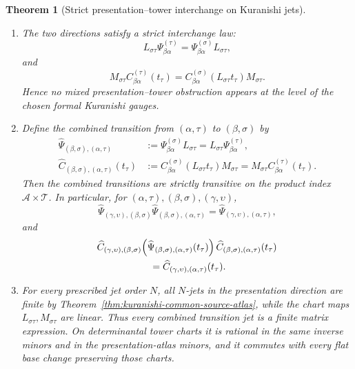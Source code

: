 \documentclass[11pt]{article}
\newtheorem{theorem}{Theorem}[section]
\theoremstyle{definition}
\begin{document}
\begin{theorem}[Strict presentation--tower interchange on Kuranishi jets]
\begin{enumerate}[label=\textnormal{(\roman*)}]
\item The two directions satisfy a strict interchange law:
\begin{equation}\label{eq:kuranishi-source-interchange}
 L_{\sigma\tau}\Psi^{(\tau)}_{\beta\alpha}
 =\Psi^{(\sigma)}_{\beta\alpha}L_{\sigma\tau},
\end{equation}
and
\begin{equation}\label{eq:kuranishi-obstruction-interchange}
 M_{\sigma\tau}C^{(\tau)}_{\beta\alpha}(t_\tau)
 =C^{(\sigma)}_{\beta\alpha}(L_{\sigma\tau}t_\tau)
  M_{\sigma\tau}.
\end{equation}
Hence no mixed presentation--tower obstruction appears at the level of the
chosen formal Kuranishi gauges.

\item Define the combined transition from $(\alpha,\tau)$ to
$(\beta,\sigma)$ by
\begin{align}
 \widehat\Psi_{(\beta,\sigma),(\alpha,\tau)}
 &:=\Psi^{(\sigma)}_{\beta\alpha}L_{\sigma\tau}
   =L_{\sigma\tau}\Psi^{(\tau)}_{\beta\alpha},
 \label{eq:kuranishi-product-source-transition}\\
 \widehat C_{(\beta,\sigma),(\alpha,\tau)}(t_\tau)
 &:=C^{(\sigma)}_{\beta\alpha}(L_{\sigma\tau}t_\tau)M_{\sigma\tau}
   =M_{\sigma\tau}C^{(\tau)}_{\beta\alpha}(t_\tau).
 \label{eq:kuranishi-product-obstruction-transition}
\end{align}
Then the combined transitions are strictly transitive on the product index
$\mathcal A\times\mathcal T$.  In particular, for
$(\alpha,\tau),(\beta,\sigma),(\gamma,\upsilon)$,
\begin{equation}\label{eq:kuranishi-product-source-cocycle}
 \widehat\Psi_{(\gamma,\upsilon),(\beta,\sigma)}
 \widehat\Psi_{(\beta,\sigma),(\alpha,\tau)}
 =\widehat\Psi_{(\gamma,\upsilon),(\alpha,\tau)},
\end{equation}
and
\begin{align}\label{eq:kuranishi-product-obstruction-cocycle}
 &\widehat C_{(\gamma,\upsilon),(\beta,\sigma)}
 \!\left(\widehat\Psi_{(\beta,\sigma),(\alpha,\tau)}(t_\tau)\right)
 \widehat C_{(\beta,\sigma),(\alpha,\tau)}(t_\tau)\\
 &\hspace{5.5em}=
 \widehat C_{(\gamma,\upsilon),(\alpha,\tau)}(t_\tau).
\end{align}

\item For every prescribed jet order $N$, all $N$-jets in the presentation
direction are finite by Theorem~\ref{thm:kuranishi-common-source-atlas}, while
the chart maps $L_{\sigma\tau},M_{\sigma\tau}$ are linear.  Thus every combined
transition jet is a finite matrix expression.  On determinantal tower charts
it is rational in the same inverse minors and in the presentation-atlas
minors, and it commutes with every flat base change preserving those charts.


\end{enumerate}
\end{theorem}
\end{document}
